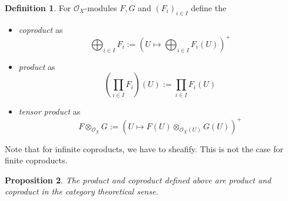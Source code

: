 \documentclass{scrartcl}
\renewcommand{\O}{\mathcal{O}}
\newtheorem{prop}{Proposition}[section]
\theoremstyle{definition}
\newtheorem{definition}[prop]{Definition}
\begin{document}
\begin{definition}
    For $\O_X$-modules $F, G$ and $(F_i)_{i \in I}$ define the
    \begin{itemize}
        \item \emph{coproduct} as
        \begin{equation*}
            \bigoplus_{i \in I} F_i := \left( U \mapsto \bigoplus_{i \in I} F_i(U) \right)^+
        \end{equation*}
        \item \emph{product} as
        \begin{equation*}
            \left( \prod_{i \in I} F_i \right)(U) := \prod_{i \in I} F_i(U)
        \end{equation*}
        \item \emph{tensor product} as
        \begin{equation*}
            F \otimes_{\O_X} G := \left( U \mapsto F(U) \otimes_{\O_X(U)} G(U) \right)^+
        \end{equation*}
    \end{itemize}
\end{definition}
Note that for infinite coproducts, we have to sheafify.
This is not the case for finite coproducts.
\begin{prop}
    The product and coproduct defined above are product and coproduct in the category theoretical sense.
\end{prop}
\end{document}
